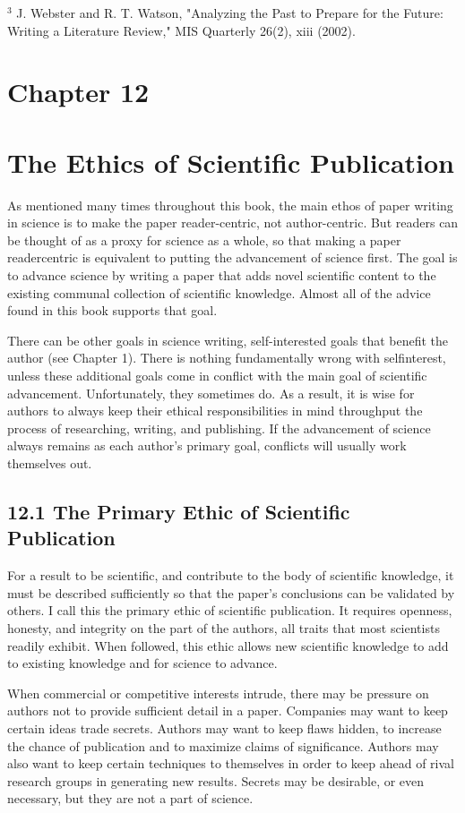 ${ }^{3}$ J. Webster and R. T. Watson, "Analyzing the Past to Prepare for the Future: Writing a Literature Review," MIS Quarterly 26(2), xiii (2002).

\section*{Chapter 12}
\section*{The Ethics of Scientific Publication}
As mentioned many times throughout this book, the main ethos of paper writing in science is to make the paper reader-centric, not author-centric. But readers can be thought of as a proxy for science as a whole, so that making a paper readercentric is equivalent to putting the advancement of science first. The goal is to advance science by writing a paper that adds novel scientific content to the existing communal collection of scientific knowledge. Almost all of the advice found in this book supports that goal.

There can be other goals in science writing, self-interested goals that benefit the author (see Chapter 1). There is nothing fundamentally wrong with selfinterest, unless these additional goals come in conflict with the main goal of scientific advancement. Unfortunately, they sometimes do. As a result, it is wise for authors to always keep their ethical responsibilities in mind throughput the process of researching, writing, and publishing. If the advancement of science always remains as each author's primary goal, conflicts will usually work themselves out.

\subsection*{12.1 The Primary Ethic of Scientific Publication}
For a result to be scientific, and contribute to the body of scientific knowledge, it must be described sufficiently so that the paper's conclusions can be validated by others. I call this the primary ethic of scientific publication. It requires openness, honesty, and integrity on the part of the authors, all traits that most scientists readily exhibit. When followed, this ethic allows new scientific knowledge to add to existing knowledge and for science to advance.

When commercial or competitive interests intrude, there may be pressure on authors not to provide sufficient detail in a paper. Companies may want to keep certain ideas trade secrets. Authors may want to keep flaws hidden, to increase the chance of publication and to maximize claims of significance. Authors may also want to keep certain techniques to themselves in order to keep ahead of rival research groups in generating new results. Secrets may be desirable, or even necessary, but they are not a part of science.

